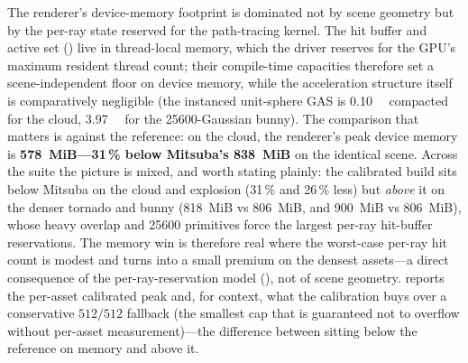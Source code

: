 The renderer's device-memory footprint is dominated not by scene geometry but by the per-ray state
reserved for the path-tracing kernel. The hit buffer and active set () live in
thread-local memory, which the driver reserves for the GPU's maximum resident thread count; their
compile-time capacities therefore set a scene-independent floor on device memory, while the
acceleration structure itself is comparatively negligible (the instanced unit-sphere GAS is
\SI{0.10}{\mega\byte} compacted for the cloud, \SI{3.97}{\mega\byte} for the \num{25600}-Gaussian
bunny). The comparison that matters is against the reference: on the cloud, the renderer's peak device
memory is \textbf{\SI{578}{MiB}---\num{31}\,\% below Mitsuba's \SI{838}{MiB}} on the identical scene.
Across the suite the picture is mixed, and worth stating plainly: the calibrated build sits below Mitsuba
on the cloud and explosion (\num{31}\,\% and \num{26}\,\% less) but \emph{above} it on the denser tornado
and bunny (\SI{818}{MiB} vs \SI{806}{MiB}, and \SI{900}{MiB} vs \SI{806}{MiB}), whose heavy overlap and
\num{25600} primitives force the largest per-ray hit-buffer reservations. The memory win is therefore real
where the worst-case per-ray hit count is modest and turns into a small premium on the densest assets---a
direct consequence of the per-ray-reservation model (), not of scene geometry.
 reports the per-asset calibrated peak and, for context, what the calibration buys over a
conservative \(512/512\) fallback (the smallest cap that is guaranteed not to overflow without per-asset
measurement)---the difference between sitting below the reference on memory and above it.

